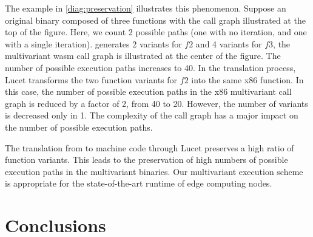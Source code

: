 

The example in \autoref{diag:preservation}  illustrates this phenomenon.
Suppose an original binary composed of three functions with the call graph illustrated at the top of the figure. Here, we count 2 possible paths (one with no iteration, and one with a single iteration).
\tool generates 2 variants for $f2$ and 4 variants for $f3$, the multivariant wasm call graph is illustrated at the center of the figure. The number of possible execution paths increases to 40.
In the translation process, Lucet transforms the two \wasm function variants for $f2$ into the same x86 function.
In this case, the number of possible execution paths in the x86 multivariant call graph is reduced by a factor of 2, from 40 to 20.
However, the number of variants is decreased only in 1. 
The complexity of the call graph has a major impact on the number of possible execution paths. 


	The translation from \wasm to machine code through Lucet preserves a high ratio of function variants. This leads to the preservation of high numbers of possible execution paths in the multivariant binaries. 
	Our multivariant execution scheme is appropriate for the state-of-the-art runtime of edge computing nodes.


\section{Conclusions}





